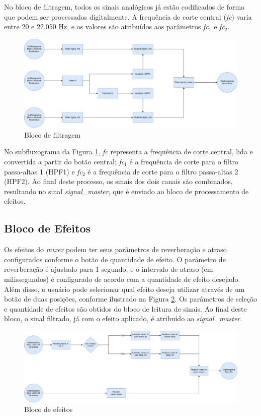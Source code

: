 No bloco de filtragem, todos os sinais analógicos já estão codificados de forma que podem ser processados digitalmente. A frequência de corte central (\textit{fc}) varia entre 20 e 22.050 Hz, e os valores são atribuídos aos parâmetros \textit{fc$_{1}$} e \textit{fc$_{2}$}.

\begin{figure}[h]
    \centering
    \includegraphics[width=\textwidth]{figuras/fig55.png}
    \caption{Bloco de filtragem}
    \label{fig55}
\end{figure}

No subfluxograma da Figura \ref{fig55}, \textit{fc} representa a frequência de corte central, lida e convertida a partir do botão central; \textit{fc$_{1}$} é a frequência de corte para o filtro passa-altas 1 (HPF1) e \textit{fc$_{2}$} é a frequência de corte para o filtro passa-altas 2 (HPF2). Ao final deste processo, os sinais dos dois canais são combinados, resultando no sinal \textit{signal\_master}, que é enviado ao bloco de processamento de efeitos.

\subsection{Bloco de Efeitos}

Os efeitos do \textit{mixer} podem ter seus parâmetros de reverberação e atraso configurados conforme o botão de quantidade de efeito. O parâmetro de reverberação é ajustado para 1 segundo, e o intervalo de atraso (em milissegundos) é configurado de acordo com a quantidade de efeito desejado.
Além disso, o usuário pode selecionar qual efeito deseja utilizar através de um botão de duas posições, conforme ilustrado na Figura \ref{fig56}. Os parâmetros de seleção e quantidade de efeitos são obtidos do bloco de leitura de sinais. Ao final deste bloco, o sinal filtrado, já com o efeito aplicado, é atribuído ao \textit{signal\_master}.

\begin{figure}[h]
    \centering
    \includegraphics[width=\textwidth]{figuras/fig56.png}
    \caption{Bloco de efeitos}
    \label{fig56}
\end{figure}

